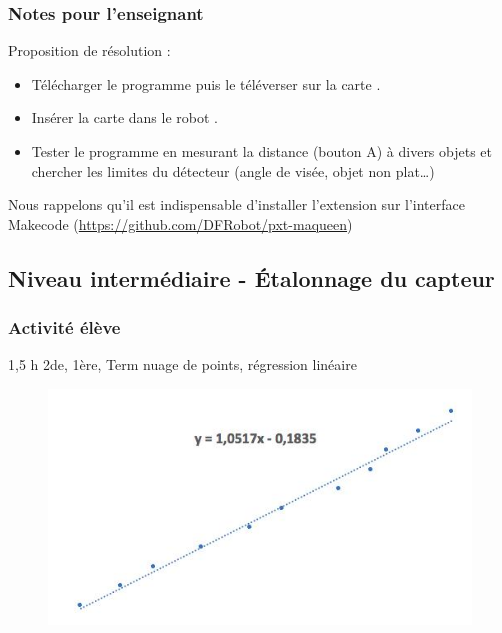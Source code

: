 \subsubsection{Notes pour l'enseignant}

%
%
\begin{methode}
Proposition de résolution :
\begin{itemize}
    \item Télécharger le programme puis le téléverser sur la carte \mb.
    \item Insérer la carte dans le robot \mq.
    \item Tester le programme en mesurant la distance (bouton A) à divers objets et chercher les limites du détecteur (angle de visée, objet non plat…)
\end{itemize} 
\end{methode}


\begin{remarque}
    Nous rappelons qu'il est indispensable d'installer l'extension \mq sur l'interface Makecode  (\url{https://github.com/DFRobot/pxt-maqueen})
\end{remarque}






\newpage


\subsection{Niveau intermédiaire - Étalonnage du capteur}

\subsubsection{Activité élève}

\cartouche
{1,5 h}         %
{2de, 1ère, Term}           %
{nuage de points, régression linéaire}        %
{}     %
{}       %



\begin{figure}
    \includegraphics[width=\linewidth]{res/maqueen-fiche1-20.jpg}
\end{figure}


